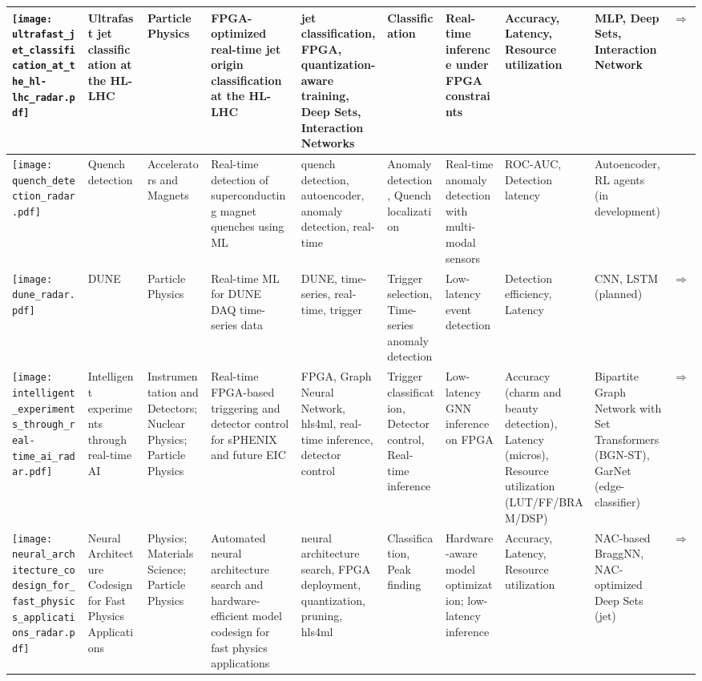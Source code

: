 \begin{landscape}
{\begin{longtable}{|p{}|p{}|p{}|p{}|p{}|p{}|p{}|p{}|p{}|p{}|}
\texttt{[image: ultrafast\_jet\_classification\_at\_the\_hl-lhc\_radar.pdf]} & Ultrafast jet classification at the HL-LHC & Particle Physics & FPGA-optimized real-time jet origin classification at the HL-LHC & jet classification, FPGA, quantization-aware training, Deep Sets, Interaction Networks & Classification & Real-time inference under FPGA constraints & Accuracy, Latency, Resource utilization & MLP, Deep Sets, Interaction Network & \cite{odagiu2024ultrafastjetclassificationfpgas}\href{https://arxiv.org/pdf/2402.01876}{$\Rightarrow$} \\ \hline
\texttt{[image: quench\_detection\_radar.pdf]} & Quench detection & Accelerators and Magnets & Real-time detection of superconducting magnet quenches using ML & quench detection, autoencoder, anomaly detection, real-time & Anomaly detection, Quench localization & Real-time anomaly detection with multi-modal sensors & ROC-AUC, Detection latency & Autoencoder, RL agents (in development) \\ \hline
\texttt{[image: dune\_radar.pdf]} & DUNE & Particle Physics & Real-time ML for DUNE DAQ time-series data & DUNE, time-series, real-time, trigger & Trigger selection, Time-series anomaly detection & Low-latency event detection & Detection efficiency, Latency & CNN, LSTM (planned) & \cite{abud2021deep}\href{https://indico.fnal.gov/event/66520/contributions/301423/attachments/182439/250508/fast\_ml\_dunedaq\_sonic\_10\_15\_24.pdf}{$\Rightarrow$} \\ \hline
\texttt{[image: intelligent\_experiments\_through\_real-time\_ai\_radar.pdf]} & Intelligent experiments through real-time AI & Instrumentation and Detectors; Nuclear Physics; Particle Physics & Real-time FPGA-based triggering and detector control for sPHENIX and future EIC & FPGA, Graph Neural Network, hls4ml, real-time inference, detector control & Trigger classification, Detector control, Real-time inference & Low-latency GNN inference on FPGA & Accuracy (charm and beauty detection), Latency (micros), Resource utilization (LUT/FF/BRAM/DSP) & Bipartite Graph Network with Set Transformers (BGN-ST), GarNet (edge-classifier) & \cite{kvapil2025intelligentexperimentsrealtimeai}\href{https://arxiv.org/pdf/2501.04845}{$\Rightarrow$} \\ \hline
\texttt{[image: neural\_architecture\_codesign\_for\_fast\_physics\_applications\_radar.pdf]} & Neural Architecture Codesign for Fast Physics Applications & Physics; Materials Science; Particle Physics & Automated neural architecture search and hardware-efficient model codesign for fast physics applications & neural architecture search, FPGA deployment, quantization, pruning, hls4ml & Classification, Peak finding & Hardware-aware model optimization; low-latency inference & Accuracy, Latency, Resource utilization & NAC-based BraggNN, NAC-optimized Deep Sets (jet) & \cite{weitz2025neuralarchitecturecodesignfast}\href{https://arxiv.org/abs/2501.05515}{$\Rightarrow$} \\ \hline

\end{longtable}}
\end{landscape}
